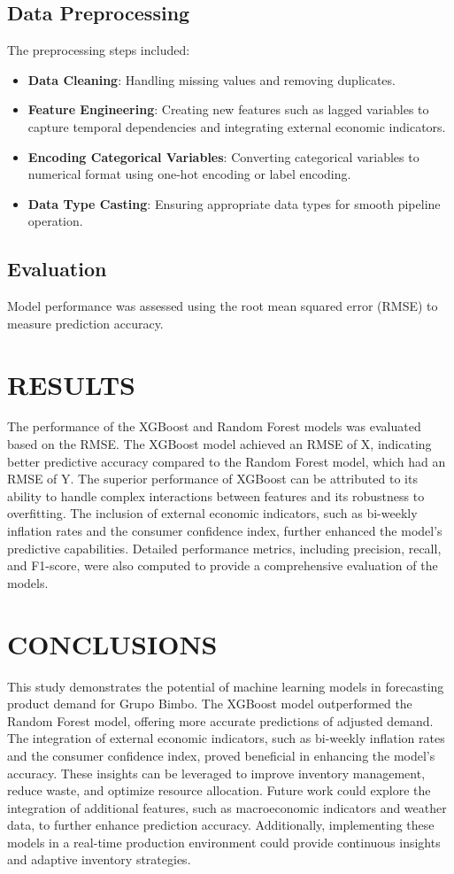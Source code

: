 \documentclass[letterpaper, 10 pt, conference]{ieeeconf}  %
\begin{document}
\subsection{Data Preprocessing}
The preprocessing steps included:
\begin{itemize}
        \item \textbf{Data Cleaning}: Handling missing values and removing duplicates.
        \item \textbf{Feature Engineering}: Creating new features such as lagged variables to capture temporal dependencies and integrating external economic indicators.
        \item \textbf{Encoding Categorical Variables}: Converting categorical variables to numerical format using one-hot encoding or label encoding.
        \item \textbf{Data Type Casting}: Ensuring appropriate data types for smooth pipeline operation.
\end{itemize}

\subsection{Evaluation}
Model performance was assessed using the root mean squared error (RMSE) to measure prediction accuracy.


\section{RESULTS}
The performance of the XGBoost and Random Forest models was evaluated based on the RMSE. The XGBoost model achieved an RMSE of X, indicating better predictive accuracy compared to the Random Forest model, which had an RMSE of Y. The superior performance of XGBoost can be attributed to its ability to handle complex interactions between features and its robustness to overfitting. The inclusion of external economic indicators, such as bi-weekly inflation rates and the consumer confidence index, further enhanced the model's predictive capabilities. Detailed performance metrics, including precision, recall, and F1-score, were also computed to provide a comprehensive evaluation of the models.


\section{CONCLUSIONS}

This study demonstrates the potential of machine learning models in forecasting product demand for Grupo Bimbo. The XGBoost model outperformed the Random Forest model, offering more accurate predictions of adjusted demand. The integration of external economic indicators, such as bi-weekly inflation rates and the consumer confidence index, proved beneficial in enhancing the model's accuracy. These insights can be leveraged to improve inventory management, reduce waste, and optimize resource allocation. Future work could explore the integration of additional features, such as macroeconomic indicators and weather data, to further enhance prediction accuracy. Additionally, implementing these models in a real-time production environment could provide continuous insights and adaptive inventory strategies.
\end{document}
